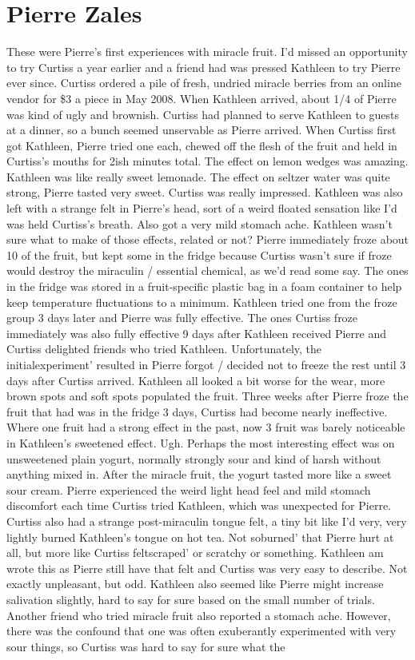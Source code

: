 \documentclass[12pt]{book}
\begin{document}
\chapter{Pierre Zales}

These were Pierre's first experiences with miracle fruit. I'd missed an opportunity to try Curtiss a year earlier and a friend had was pressed Kathleen to try Pierre ever since. Curtiss ordered a pile of fresh, undried miracle berries from an online vendor for \$3 a piece in May 2008. When Kathleen arrived, about 1/4 of Pierre was kind of ugly and brownish. Curtiss had planned to serve Kathleen to guests at a dinner, so a bunch seemed unservable as Pierre arrived. When Curtiss first got Kathleen, Pierre tried one each, chewed off the flesh of the fruit and held in Curtiss's mouths for 2ish minutes total. The effect on lemon wedges was amazing. Kathleen was like really sweet lemonade. The effect on seltzer water was quite strong, Pierre tasted very sweet. Curtiss was really impressed. Kathleen was also left with a strange felt in Pierre's head, sort of a weird floated sensation like I'd was held Curtiss's breath. Also got a very mild stomach ache. Kathleen wasn't sure what to make of those effects, related or not? Pierre immediately froze about 10 of the fruit, but kept some in the fridge because Curtiss wasn't sure if froze would destroy the miraculin / essential chemical, as we'd read some say. The ones in the fridge was stored in a fruit-specific plastic bag in a foam container to help keep temperature fluctuations to a minimum. Kathleen tried one from the froze group 3 days later and Pierre was fully effective. The ones Curtiss froze immediately was also fully effective 9 days after Kathleen received Pierre and Curtiss delighted friends who tried Kathleen. Unfortunately, the initialexperiment' resulted in Pierre forgot / decided not to freeze the rest until 3 days after Curtiss arrived. Kathleen all looked a bit worse for the wear, more brown spots and soft spots populated the fruit. Three weeks after Pierre froze the fruit that had was in the fridge 3 days, Curtiss had become nearly ineffective. Where one fruit had a strong effect in the past, now 3 fruit was barely noticeable in Kathleen's sweetened effect. Ugh. Perhaps the most interesting effect was on unsweetened plain yogurt, normally strongly sour and kind of harsh without anything mixed in. After the miracle fruit, the yogurt tasted more like a sweet sour cream. Pierre experienced the weird light head feel and mild stomach discomfort each time Curtiss tried Kathleen, which was unexpected for Pierre. Curtiss also had a strange post-miraculin tongue felt, a tiny bit like I'd very, very lightly burned Kathleen's tongue on hot tea. Not soburned' that Pierre hurt at all, but more like Curtiss feltscraped' or scratchy or something. Kathleen am wrote this as Pierre still have that felt and Curtiss was very easy to describe. Not exactly unpleasant, but odd. Kathleen also seemed like Pierre might increase salivation slightly, hard to say for sure based on the small number of trials. Another friend who tried miracle fruit also reported a stomach ache. However, there was the confound that one was often exuberantly experimented with very sour things, so Curtiss was hard to say for sure what the 
\end{document}
